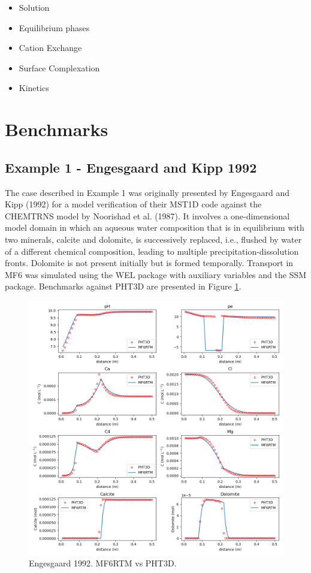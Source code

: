 \documentclass{article}
\begin{document}
\begin{itemize}
    \item  Solution
 \item Equilibrium phases
 \item Cation Exchange
 \item Surface Complexation
 \item Kinetics
\end{itemize}

\section{Benchmarks}

\subsection{Example 1 - Engesgaard and Kipp 1992}

The case described in Example 1 was originally presented by Engesgaard and Kipp (1992) for a model verification of their MST1D code against the CHEMTRNS model by Noorishad et al. (1987). It involves a one-dimensional model domain in which an aqueous water composition that is in equilibrium with two minerals, calcite and dolomite, is successively replaced, i.e., flushed by water of a different chemical composition, leading to multiple precipitation-dissolution fronts. Dolomite is not present initially but is formed temporally. Transport in MF6 was simulated using the WEL package with auxiliary variables and the SSM package. Benchmarks against PHT3D are presented in Figure \ref{fig:ex1}.




\begin{figure}[H]
\centering

    \includegraphics[width=\linewidth]{figures/ex1.png}
\caption{ Engesgaard 1992. MF6RTM vs PHT3D.}
\label{fig:ex1}
\end{figure}
\end{document}
